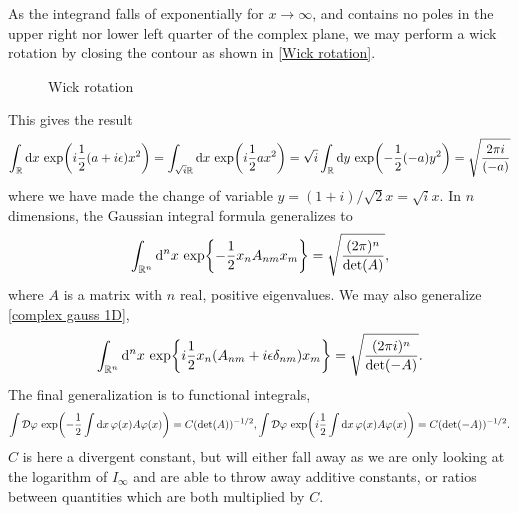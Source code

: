 As the integrand falls of exponentially for $x\rightarrow \infty$, and contains no poles in the upper right nor lower left quarter of the complex plane, we may perform a wick rotation by closing the contour as shown in \autoref{Wick rotation}.
\begin{figure}
    \centering
    \caption{Wick rotation}
    \label{Wick rotation}
\end{figure}
This gives the result
\begin{equation}
    \label{complex gauss 1D}
    \int_{\mathbb{R}} \dd x \, \exp(i \frac{1}{2}(a + i\epsilon) x^2) 
    = \int_{\sqrt{i}\mathbb{R}} \dd x \, \exp(i\frac{1}{2} ax^2)
    = \sqrt{i} \int_{\mathbb{R}} \dd y\, \exp(-\frac{1}{2} (-a) y^2) = \sqrt{\frac{2 \pi i}{(-a)}}
\end{equation}
where we have made the change of variable $y = (1+i)/\sqrt{2} x = \sqrt{i} x$.
In $n$ dimensions, the Gaussian integral formula generalizes to
\begin{equation}
    \int_{\mathbb{R}^n} \dd^n x \, \exp{-\frac{1}{2} x_n A_{nm} x_m } =\sqrt{\frac{(2 \pi)^n}{\det(A)}},
\end{equation}
where $A$ is a matrix with $n$ real, positive eigenvalues.
We may also generalize \autoref{complex gauss 1D},
\begin{align}
    \int_{\mathbb{R}^n} \dd^n x \, \exp{i\frac{1}{2} x_n( A_{nm} + i \epsilon \delta_{nm}) x_m } =\sqrt{\frac{(2 \pi i )^n}{\det(-A)}}.
\end{align}
The final generalization is to functional integrals,
\begin{align}
    \int \mathcal{D} \varphi \, \exp(- \frac{1}{2} \int \dd x \, \varphi(x) A \varphi(x) )
    = C (\det(A))^{-1/2},
    \int \mathcal{D} \varphi \, \exp(i\frac{1}{2} \int \dd x \, \varphi(x) A \varphi(x) )
    = C (\det(-A))^{-1/2}.
\end{align}
$C$ is here a divergent constant, but will either fall away as we are only looking at the logarithm of $I_\infty$ and are able to throw away additive constants, or ratios between quantities which are both multiplied by $C$.

